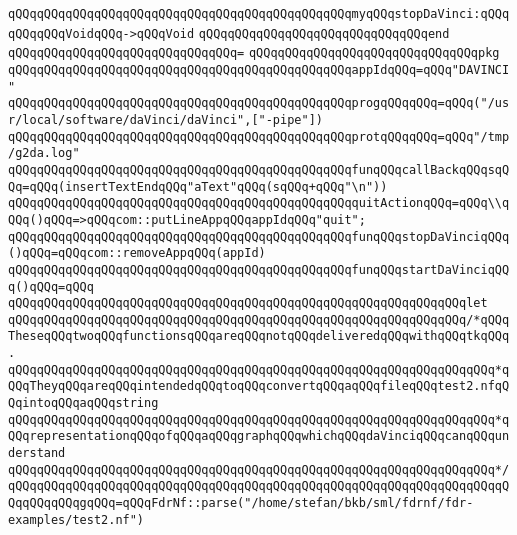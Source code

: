 \verb|qQQqqQQqqQQqqQQqqQQqqQQqqQQqqQQqqQQqqQQqqQQqqQQqmyqQQqstopDaVinci:qQQqqQQqqQQqVoidqQQq->qQQqVoid|\newline
\verb|qQQqqQQqqQQqqQQqqQQqqQQqqQQqqQQqend|\newline
\verb|qQQqqQQqqQQqqQQqqQQqqQQqqQQqqQQq=|\newline
\verb|qQQqqQQqqQQqqQQqqQQqqQQqqQQqqQQqpkg|\newline
\verb|qQQqqQQqqQQqqQQqqQQqqQQqqQQqqQQqqQQqqQQqqQQqqQQqappIdqQQq=qQQq"DAVINCI"|\newline
\verb|qQQqqQQqqQQqqQQqqQQqqQQqqQQqqQQqqQQqqQQqqQQqqQQqprogqQQqqQQq=qQQq("/usr/local/software/daVinci/daVinci",["-pipe"])|\newline
\verb|qQQqqQQqqQQqqQQqqQQqqQQqqQQqqQQqqQQqqQQqqQQqqQQqprotqQQqqQQq=qQQq"/tmp/g2da.log"|\newline
\newline
\verb|qQQqqQQqqQQqqQQqqQQqqQQqqQQqqQQqqQQqqQQqqQQqqQQqfunqQQqcallBackqQQqsqQQq=qQQq(insertTextEndqQQq"aText"qQQq(sqQQq+qQQq"\n"))|\newline
\verb|qQQqqQQqqQQqqQQqqQQqqQQqqQQqqQQqqQQqqQQqqQQqqQQqquitActionqQQq=qQQq\\qQQq()qQQq=>qQQqcom::putLineAppqQQqappIdqQQq"quit";|\newline
\newline
\verb|qQQqqQQqqQQqqQQqqQQqqQQqqQQqqQQqqQQqqQQqqQQqqQQqfunqQQqstopDaVinciqQQq()qQQq=qQQqcom::removeAppqQQq(appId)|\newline
\newline
\verb|qQQqqQQqqQQqqQQqqQQqqQQqqQQqqQQqqQQqqQQqqQQqqQQqfunqQQqstartDaVinciqQQq()qQQq=qQQq|\newline
\verb|qQQqqQQqqQQqqQQqqQQqqQQqqQQqqQQqqQQqqQQqqQQqqQQqqQQqqQQqqQQqqQQqlet|\newline
\verb|qQQqqQQqqQQqqQQqqQQqqQQqqQQqqQQqqQQqqQQqqQQqqQQqqQQqqQQqqQQqqQQq/*qQQqTheseqQQqtwoqQQqfunctionsqQQqareqQQqnotqQQqdeliveredqQQqwithqQQqtkqQQq.|\newline
\verb|qQQqqQQqqQQqqQQqqQQqqQQqqQQqqQQqqQQqqQQqqQQqqQQqqQQqqQQqqQQqqQQqqQQq*qQQqTheyqQQqareqQQqintendedqQQqtoqQQqconvertqQQqaqQQqfileqQQqtest2.nfqQQqintoqQQqaqQQqstring|\newline
\verb|qQQqqQQqqQQqqQQqqQQqqQQqqQQqqQQqqQQqqQQqqQQqqQQqqQQqqQQqqQQqqQQqqQQq*qQQqrepresentationqQQqofqQQqaqQQqgraphqQQqwhichqQQqdaVinciqQQqcanqQQqunderstand|\newline
\verb|qQQqqQQqqQQqqQQqqQQqqQQqqQQqqQQqqQQqqQQqqQQqqQQqqQQqqQQqqQQqqQQqqQQq*/|\newline
\verb|qQQqqQQqqQQqqQQqqQQqqQQqqQQqqQQqqQQqqQQqqQQqqQQqqQQqqQQqqQQqqQQqqQQqqQQqqQQqqQQqgqQQq=qQQqFdrNf::parse("/home/stefan/bkb/sml/fdrnf/fdr-examples/test2.nf")|\newline
